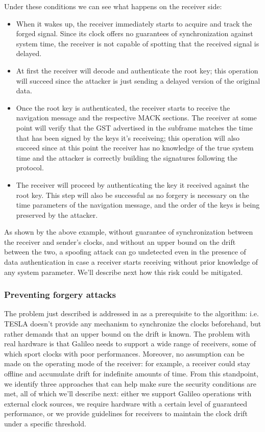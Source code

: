 Under these conditions we can see what happens on the receiver side:
\begin{itemize}
  \item When it wakes up, the receiver immediately starts to acquire and track
    the forged signal. Since its clock offers no guarantees of synchronization
    against system time, the receiver is not capable of spotting that the
    received signal is delayed.
  \item At first the receiver will decode and authenticate the root key; this
    operation will succeed since the attacker is just sending a delayed version
    of the original data.
  \item Once the root key is authenticated, the receiver starts to receive the
    navigation message and the respective MACK sections. The receiver at some
    point will verify that the GST advertised in the subframe matches 
    the time that has been signed by the keys it's receiveing; this operation
    will also succeed since at this point the receiver has no knowledge of the
    true system time and the attacker is correctly building the signatures
    following the protocol.
  \item The receiver will proceed by authenticating the key it received against
    the root key. This step will also be successful as no forgery is necessary
    on the time parameters of the navigation message, and the order of the keys
    is being preserved by the attacker.
\end{itemize}

As shown by the above example, without guarantee of synchronization between the receiver
and sender's clocks, and without an upper bound on the drift between the two, a
spoofing attack can go undetected even in the presence of data authentication in
case a receiver starts receiving without prior knowledge of any system
parameter. We'll describe next how this risk could be mitigated.

\subsubsection{Preventing forgery attacks}
The problem just described is addressed in \cite{perrig} as a prerequisite to
the algorithm: i.e. TESLA doesn't provide any mechanism to synchronize
the clocks beforehand, but rather demands that an upper bound on the drift is
known. The problem with real hardware is that Galileo needs to support a wide
range of receivers, some of which sport clocks with poor performances. Moreover,
no assumption can be made on the operating mode of the receiver: for example,
a receiver could stay offline and accumulate drift for indefinite amounts of
time. From this standpoint, we identify three approaches that can help make sure
the security conditions are met, all of which we'll describe next: either we
support Galileo operations with external clock sources, we require hardware with
a certain level of guaranteed performance, or we provide guidelines for
receivers to maintain the clock drift under a specific threshold.

